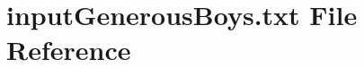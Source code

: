 \hypertarget{inputGenerousBoys_8txt}{}\section{input\+Generous\+Boys.\+txt File Reference}
\label{inputGenerousBoys_8txt}
